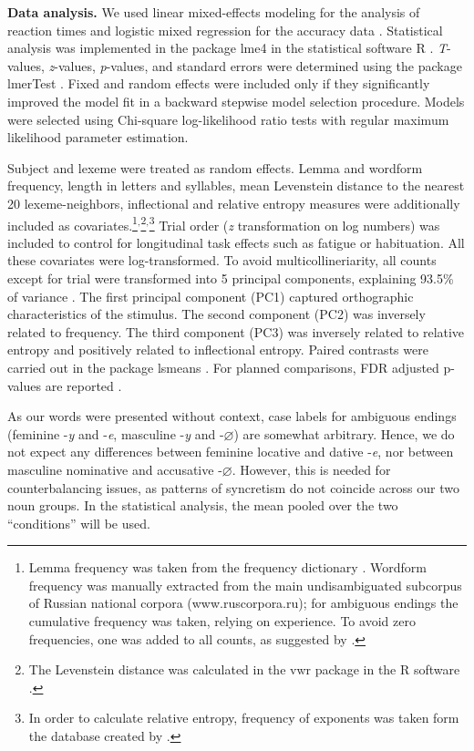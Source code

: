 \documentclass[output=paper, modfonts,newtxmath,hidelinks]{langscibook}
\begin{document}
\textbf{Data analysis.} 
We used linear mixed-effects modeling for the analysis of reaction times and logistic mixed regression for the accuracy data  \citep{baayen2008analyzing}. Statistical analysis was implemented in the package lme4  \citep{bates2014lme4} in the statistical software R \citep{team2014r}. \textit{T}-values, \textit{z}-values, \textit{p}-values, and standard errors were determined using the package lmerTest \citep{kuznetsova2015package}. Fixed and random effects were included only if they significantly improved the model fit in a backward stepwise model selection procedure. Models were selected using Chi-square log-likelihood ratio tests with regular maximum likelihood parameter estimation. 

Subject and lexeme were treated as random effects. Lemma and wordform frequency, length in letters and syllables, mean Levenstein distance to the nearest 20 lexeme-neighbors, 
inflectional and relative entropy measures were additionally included as covariates.\footnote{Lemma frequency was taken from the frequency dictionary \citep{lyashevskaya2009frequency}. Wordform frequency was manually extracted from the main undisambiguated subcorpus of Russian national corpora (www.ruscorpora.ru); for ambiguous endings the cumulative frequency was taken,  relying on  experience. To avoid zero frequencies, one was added to all counts, as suggested by \citet*{brysbaert2013dealing}.}$^,$\footnote{The Levenstein distance was calculated in the vwr package \citep{keuleers2013vwr} in the R software \citep{team2014r}.}$^,$\footnote{In order to calculate relative entropy, frequency of exponents was taken form the database created by \citet*{samojlova2014frequencies}.} Trial order (\textit{z} transformation on log numbers) was included to control for longitudinal task effects such as fatigue or habituation. All these covariates were log-transformed. To avoid multicollineriarity, all counts except for trial were transformed into 5 principal components, explaining 93.5\% of variance \citep{baayen2008analyzing}. The first principal component (PC1) captured orthographic characteristics of the stimulus. The second component (PC2) was inversely related to frequency. The third component (PC3) was inversely related to relative entropy and positively related to inflectional entropy. Paired contrasts were carried out in the package lsmeans \citep{lenth2016least}. For planned comparisons, FDR adjusted p-values are reported \citep{benjamini1995controlling}. 

As our words were presented without context, case labels for ambiguous endings (feminine -\textit{y} and -\textit{e}, masculine -\textit{y} and -\textit{$\varnothing$}) are somewhat arbitrary. Hence, we do not expect any differences between feminine locative and dative -\textit{e}, nor between masculine nominative and accusative -\textit{$\varnothing$}. However, this is needed for counterbalancing issues, as patterns of syncretism do not coincide across our two noun groups. In the statistical analysis, the mean pooled over the two ``conditions'' will be used.
\end{document}
